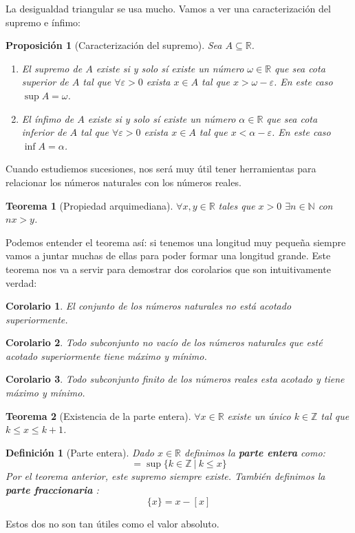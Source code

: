 \documentclass{article}
\newtheorem{theorem}{Teorema}
\newtheorem{prop}{Proposición}
\newtheorem{cor}{Corolario}
\newtheorem{define}{Definición}
\begin{document}
La desigualdad triangular se usa mucho. Vamos a ver una caracterización del supremo e ínfimo:
\begin{prop}[Caracterización del supremo]
Sea $A\subseteq \mathbb{R}$.
\begin{enumerate}
\item
El supremo de $A$ existe si y solo sí existe un número $\omega \in \mathbb{R}$ que sea cota superior de $A$ tal que $\forall \varepsilon > 0$ exista $x \in A$ tal que $x > \omega - \varepsilon$. En este caso $\sup A = \omega$.

\item
El ínfimo de $A$ existe si y solo sí existe un número $\alpha \in \mathbb{R}$ que sea cota inferior de $A$ tal que $\forall \varepsilon > 0$ exista $x \in A$ tal que $x < \alpha - \varepsilon$. En este caso $\inf A = \alpha$.
\end{enumerate}
\end{prop}


Cuando estudiemos sucesiones, nos será muy útil tener herramientas para relacionar los números naturales con los números reales.


\begin{theorem}[Propiedad arquimediana]
$\forall x,y \in \mathbb{R}$ tales que $x>0$ $\exists n \in \mathbb{N}$ con $nx>y$.
\end{theorem}
Podemos entender el teorema así: si tenemos una longitud muy pequeña siempre vamos a juntar muchas de ellas para poder formar una longitud grande. Este teorema nos va a servir para demostrar dos corolarios que son intuitivamente verdad:
\begin{cor}
	El conjunto de los números naturales no está acotado superiormente.
\end{cor}
\begin{cor}
	Todo subconjunto no vacío de los números naturales que esté acotado superiormente tiene máximo y mínimo.
\end{cor}
\begin{cor}
	Todo subconjunto finito de los números reales esta acotado y tiene máximo y mínimo.
\end{cor}

\begin{theorem}[Existencia de la parte entera]
$\forall x \in \mathbb{R}$ existe un único $k \in \mathbb{Z}$ tal que $k\leq x\leq k+1$.
\end{theorem}
\begin{define}[Parte entera]
Dado $x \in \mathbb{R}$ definimos la \textbf{parte entera} como:
\begin{equation}
[x] = \sup \{k\in \mathbb{Z}\ |\ k\leq x\}
\end{equation}
Por el teorema anterior, este supremo siempre existe. También definimos la \textbf{parte fraccionaria} :
\begin{equation}
\{x\} = x - [x]
\end{equation}
\end{define}
Estos dos no son tan útiles como el valor absoluto.
\end{document}
